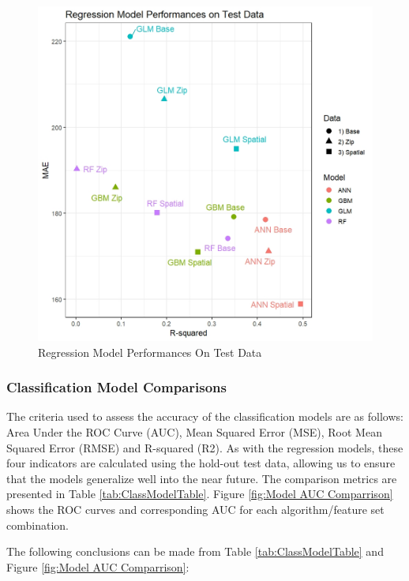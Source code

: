 \documentclass[12pt,]{article}
\begin{document}
\begin{figure}[H]
\includegraphics[width=1\linewidth]{Sections/tables and figures/reg_model_results_scatterplot} \caption{Regression Model Performances On Test Data}\label{fig:reg Models Scatterplot}
\end{figure}

\hypertarget{classification-model-comparisons}{%
\subsubsection{Classification Model
Comparisons}\label{classification-model-comparisons}}

The criteria used to assess the accuracy of the classification models
are as follows: Area Under the ROC Curve (AUC), Mean Squared Error
(MSE), Root Mean Squared Error (RMSE) and R-squared (R2). As with the
regression models, these four indicators are calculated using the
hold-out test data, allowing us to ensure that the models generalize
well into the near future. The comparison metrics are presented in Table
\ref{tab:ClassModelTable}. Figure \ref{fig:Model AUC Comparrison} shows
the ROC curves and corresponding AUC for each algorithm/feature set
combination.

\noindent The following conclusions can be made from Table
\ref{tab:ClassModelTable} and Figure \ref{fig:Model AUC Comparrison}:
\end{document}
